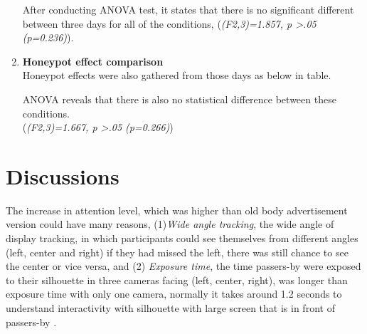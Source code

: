 \begin{enumerate}
\begin{table}[H]
\caption{Cross tabulation for each condition Landing effect }
\label{tab:newbodylandingeffect}
\centering
{}
\end{table}
After conducting ANOVA test, it states that there is no significant different between three days for all of the conditions, 
(\emph{(F2,3)=1.857, p >.05 (p=0.236)}). 


\item \textbf{Honeypot effect comparison}\\
Honeypot effects were also gathered from those days as below in table.

\begin{table}[H]
\caption{Cross tabulation for each condition Honeypot effect }
\label{tab:newbodyhoneypoteffect}
\centering
{}
\end{table}

ANOVA reveals that there is also no statistical difference between these conditions. \\
(\emph{(F2,3)=1.667, p >.05 (p=0.266)})


\end{enumerate}


\newpage
\section{Discussions}
The increase in attention level, which was higher than old body advertisement version could have many reasons, (1)\emph{Wide angle tracking}, the wide angle of display tracking, in which participants could see themselves from different angles (left, center and right) if they had missed the left, there was still chance to see the center or vice versa, and (2) \emph{Exposure time}, the time passers-by were exposed to their silhouette in three cameras facing (left, center, right), was longer than exposure time with only one camera, normally it takes around 1.2 seconds to understand interactivity with silhouette with large screen that is in front of passers-by \cite{ LookingGlass}.

